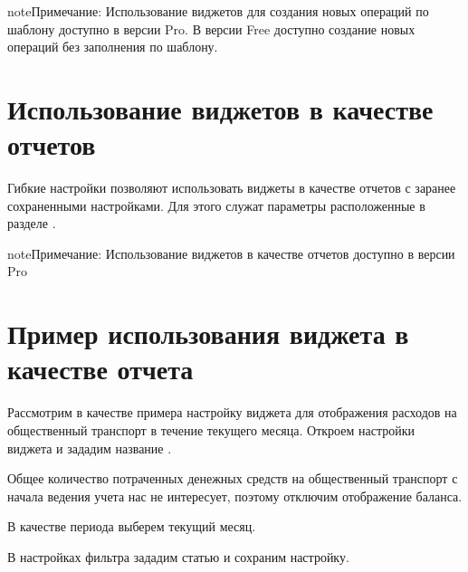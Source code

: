 \documentclass[a4paper,10pt,russian]{sphinxmanual}
\begin{document}
\begin{sphinxadmonition}{note}{Примечание:}
Использование виджетов для создания новых операций по шаблону доступно в версии Pro. В версии Free доступно создание новых операций без заполнения по шаблону.
\end{sphinxadmonition}


\section{Использование виджетов в качестве отчетов}
\label{\detokenize{widgets:id4}}
Гибкие настройки позволяют использовать виджеты в качестве отчетов с заранее сохраненными настройками. Для этого
служат параметры расположенные в разделе .

\begin{sphinxadmonition}{note}{Примечание:}
Использование виджетов в качестве отчетов доступно в версии Pro
\end{sphinxadmonition}


\section{Пример использования виджета в качестве отчета}
\label{\detokenize{widgets:id5}}
Рассмотрим в качестве примера настройку виджета для отображения расходов на общественный транспорт в течение текущего месяца.
Откроем настройки виджета и зададим название .

\noindent{}
\noindent{}
\noindent{}

Общее количество потраченных денежных средств на общественный транспорт с начала ведения учета нас не интересует,
поэтому отключим отображение баланса.

В качестве периода выберем текущий месяц.

\noindent{}
\noindent{}
\noindent{}

В настройках фильтра зададим статью  и сохраним настройку.
\end{document}
